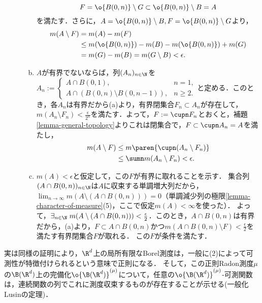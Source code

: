 \documentclass[uplatex, dvipdfmx]{jsreport}
\begin{document}
\begin{Proof}
\begin{description}
\begin{enumerate}[(a)]
            \[F=\o{B(0,n)}\setminus G\subset\o{B(0,n)}\setminus B=A\]
            を満たす．さらに，$A=\o{B(0,n)}\setminus B,F=\o{B(0,n)}\setminus G$より，
            \begin{align*}
                m(A\setminus F)&=m(A)-m(F)\\
                &\le m(\o{B(0,n)})-m(B)-m(\o{B(0,n)})+m(G)\\
                &=m(G)-m(B)=m(G\setminus B)<\epsilon.
            \end{align*}
            \item $A$が有界でないならば，列$(A_n)_{n\in\N}$を$A_n:=\begin{cases}
                A\cap B(0,1),&n=1,\\
                A\cap (B(0,n)\setminus B(0,n-1)),&n\ge 2.
            \end{cases}$と定める．このとき，各$A_n$は有界だから(a)より，有界閉集合$F_n\subset A_n$が存在して，$m(A_n\setminus F_n)<\frac{\epsilon}{2^n}$を満たす．よって，$F:=\cupn F_n$とおくと，補題\ref{lemma-general-topology}よりこれは閉集合で，$F\subset\cupn A_n=A$を満たし，
            \begin{align*}
                m(A\setminus F)&\le m\paren{\cupn(A_n\setminus F_n)}\\
                &\le\sumn m(A_n\setminus F_n)<\epsilon.
            \end{align*}
            \item $m(A)<\epsilon$と仮定して，この$F$が有界に取れることを示す．
            集合列$(A\cap B(0,n))_{n\in\N}$は$A$に収束する単調増大列だから，$\lim_{n\to\infty}m(A\setminus(A\cap B(0,n)))=0$（単調減少列の極限\ref{lemma-character-of-measure}(5)，ここで仮定$m(A)<\infty$を使った）．
            よって，$\exists_{n\in\N}\;m(A\setminus (A\cap B(0,n)))<\frac{\epsilon}{2}$．このとき，$A\cap B(0,n)$は有界だから，(a)より，$F\subset A\cap B(0,n)$かつ$m(A\cap B(0,n)\setminus F)<\frac{\epsilon}{2}$を満たす有界閉集合$F$が取れる．
            この$F$が条件を満たす．
        \end{enumerate}
    \end{description}
\end{Proof}
\begin{remarks}[Euclid空間上の局所有限Borel測度は正則]
    実は同様の証明により，$\R^d$上の局所有限なBorel測度は，一般に(2)によって可測性が特徴付けられるという意味で正則になる．
    そして，この正則Radon測度$\mu$の$\B(\R^d)$上の完備化$\o{\B(\R^d)}^{(\mu)}$について，任意の$\o{\B(\R^d)}^{(\mu)}$-可測関数は，連続関数の列でこれに測度収束するものが存在することが示せる(一般化Lusinの定理)．
\end{remarks}
\end{document}
